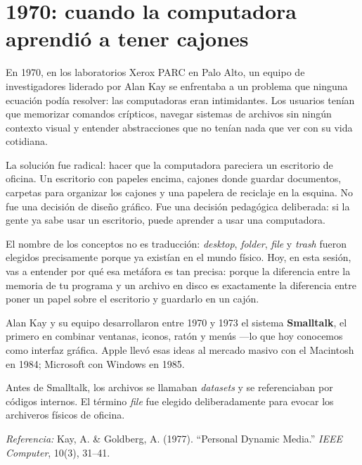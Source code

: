 \documentclass[12pt, oneside]{article}
\begin{document}

\tableofcontents
\newpage

\section{1970: cuando la computadora aprendió a tener cajones}

En 1970, en los laboratorios Xerox PARC en Palo Alto, un equipo de investigadores
liderado por Alan Kay se enfrentaba a un problema que ninguna ecuación podía
resolver: las computadoras eran intimidantes.  Los usuarios tenían que memorizar
comandos crípticos, navegar sistemas de archivos sin ningún contexto visual y
entender abstracciones que no tenían nada que ver con su vida cotidiana.

La solución fue radical: hacer que la computadora pareciera un escritorio de
oficina.  Un escritorio con papeles encima, cajones donde guardar documentos,
carpetas para organizar los cajones y una papelera de reciclaje en la esquina.
No fue una decisión de diseño gráfico.  Fue una decisión pedagógica deliberada:
si la gente ya sabe usar un escritorio, puede aprender a usar una computadora.

El nombre de los conceptos no es traducción: \textit{desktop}, \textit{folder},
\textit{file} y \textit{trash} fueron elegidos precisamente porque ya existían
en el mundo físico.  Hoy, en esta sesión, vas a entender por qué esa metáfora
es tan precisa: porque la diferencia entre la memoria de tu programa y un
archivo en disco es exactamente la diferencia entre poner un papel sobre el
escritorio y guardarlo en un cajón.

\begin{tecnico}
  Alan Kay y su equipo desarrollaron entre 1970 y 1973 el sistema
  \textbf{Smalltalk}, el primero en combinar ventanas, iconos, ratón y menús
  —lo que hoy conocemos como interfaz gráfica.  Apple llevó esas ideas al
  mercado masivo con el Macintosh en 1984; Microsoft con Windows en 1985.
  \par\smallskip
  Antes de Smalltalk, los archivos se llamaban \textit{datasets} y se
  referenciaban por códigos internos.  El término \textit{file} fue elegido
  deliberadamente para evocar los archiveros físicos de oficina.
  \par\smallskip
  \textit{Referencia:} Kay, A. \& Goldberg, A. (1977). ``Personal Dynamic
  Media.'' \textit{IEEE Computer}, 10(3), 31--41.
\end{tecnico}
\end{document}
